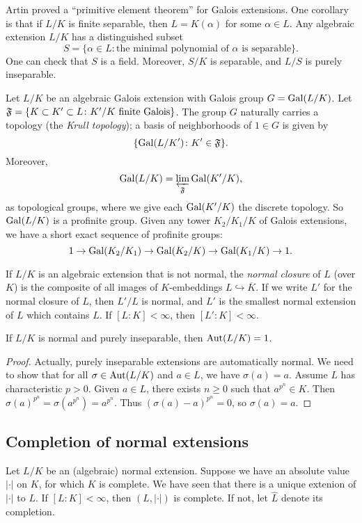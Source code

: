 Artin proved a ``primitive element theorem'' for Galois extensions. One 
corollary is that if $L/K$ is finite separable, then $L=K(\alpha)$ for some 
$\alpha\in L$. Any algebraic extension $L/K$ has a distinguished 
subset 
\[
	S = \{\alpha\in L\colon \text{the minimal polynomial of $\alpha$ is separable}\} .
\]
One can check that $S$ is a field. Moreover, $S/K$ is separable, and $L/S$ is 
purely inseparable. 

Let $L/K$ be an algebraic Galois extension with Galois group $G=\operatorname{Gal}(L/K)$. 
Let $\mathfrak{F}=\{K\subset K'\subset L\colon K'/K\text{ finite Galois}\}$. The group 
$G$ naturally carries a topology (the \emph{Krull topology}); a basis of 
neighborhoods of $1\in G$ is given by 
\[
  \{\operatorname{Gal}(L/K')\colon K'\in \mathfrak{F}\} .
\]
Moreover, 
\[
  \operatorname{Gal}(L/K) = \varprojlim_{\mathfrak{F}} \operatorname{Gal}(K'/K) ,
\]
as topological groups, where we give each $\operatorname{Gal}(K'/K)$ the discrete 
topology. So $\operatorname{Gal}(L/K)$ is a profinite group. Given any tower 
$K_2/K_1/K$ of Galois extensions, we have a short exact sequence of profinite 
groups:
\[
  1 \to \operatorname{Gal}(K_2/K_1) \to \operatorname{Gal}(K_2/K) \to \operatorname{Gal}(K_1/K)\to 1 .
\]

If $L/K$ is an algebraic extension that is not normal, the \emph{normal 
closure} of $L$ (over $K$) is the composite of all images of $K$-embeddings 
$L\hookrightarrow \overline K$. If we write $L'$ for the normal closure of 
$L$, then $L'/L$ is normal, and $L'$ is the smallest normal extension of $L$ 
which contains $L$. If $[L\colon K]<\infty$, then $[L'\colon K]<\infty$. 

\begin{lemma}
If $L/K$ is normal and purely inseparable, then $\operatorname{Aut}(L/K)=1$. 
\end{lemma}
\begin{proof}
Actually, purely inseparable extensions are automatically normal. We need to 
show that for all $\sigma\in \operatorname{Aut}(L/K)$ and $a\in L$, we have $\sigma(a)=a$. 
Assume $L$ has characteristic $p>0$. Given $a\in L$, there exists 
$n\geqslant 0$ such that $a^{p^n}\in K$. Then 
$\sigma(a)^{p^n} = \sigma(a^{p^n}) = a^{p^n}$. Thus 
$(\sigma(a)-a)^{p^n}=0$, so $\sigma(a)=a$. 
\end{proof}



\subsection{Completion of normal extensions}

Let $L/K$ be an (algebraic) normal extension. Suppose we have an absolute 
value $|\cdot|$ on $K$, for which $K$ is complete. We have seen that there is a 
unique extenion of $|\cdot|$ to $L$. If $[L\colon K]<\infty$, then $(L,|\cdot|)$ 
is complete. If not, let $\widehat L$ denote its completion. 

